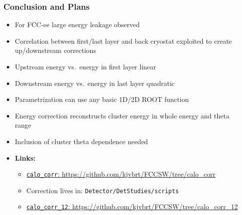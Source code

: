\documentclass[aspectratio=169]{beamer}
\newcommand{\backupbegin}{%
   \newcounter{finalframe}
   \setcounter{finalframe}{\value{framenumber}}
}
\newcommand{\backupend}{%
   \setcounter{framenumber}{\value{finalframe}}
}
\newcommand{\bluetext}[1]{%
  \textcolor{myBlue}{#1}
}
\newcommand{\redtext}[1]{%
  \textcolor{myRed}{#1}
}
\begin{document}
\begin{frame}
  \frametitle{Conclusion and Plans}

  \begin{itemize}
    \item For FCC-ee large energy leakage observed
    \item Correlation between first/last layer and back cryostat exploited to create
          up/downstream corrections
    \item \redtext{Upstream} energy vs.\ energy in first layer \redtext{linear}
    \item \redtext{Downstream} energy vs.\ energy in last layer
          \redtext{quadratic}
    \item Parametrization can use any basic 1D/2D ROOT function
    \item Energy correction reconstructs cluster energy in whole energy and
          theta range
    \item \redtext{Inclusion of cluster theta dependence needed}
    \item \bluetext{\bf Links:}
          \begin{itemize}
            \item \href{https://github.com/kjvbrt/FCCSW/tree/calo_corr}
                  {\footnotesize \bluetext{\texttt{calo\_corr}: https://github.com/kjvbrt/FCCSW/tree/calo\_corr}}
            \item {\footnotesize \bluetext{Correction lives in: \texttt{Detector/DetStudies/scripts}}}
            \item \href{https://github.com/kjvbrt/FCCSW/tree/calo_corr_12}
                  {\scriptsize \bluetext{\texttt{calo\_corr\_12}: https://github.com/kjvbrt/FCCSW/tree/calo\_corr\_12}}
          \end{itemize}
  \end{itemize}
\end{frame}


%
%
\end{document}
